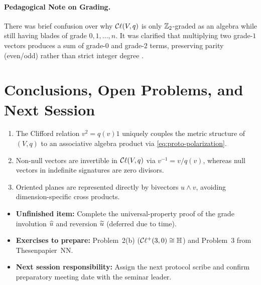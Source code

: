 \documentclass[11pt,a4paper]{article}
\begin{document}
\paragraph{Pedagogical Note on Grading.}
There was brief confusion over why $\mathcal{C}\ell(V, q)$ is only $\mathbb{Z}_2$-graded as an
algebra while still having blades of grade $0, 1, \dots, n$. It was clarified
that multiplying two grade-$1$ vectors produces a sum of grade-$0$ and
grade-$2$ terms, preserving parity (even/odd) rather than strict integer
degree \cite[Sect.~2.2]{vazIntroductionCliffordAlgebras2016}.

\section{Conclusions, Open Problems, and Next Session}
\label{sec:conclusions}

\begin{takeaways}
  \begin{enumerate}
    \item The Clifford relation $v^2 = q(v) 1$ uniquely couples the metric
      structure of $(V, q)$ to an associative algebra product via
      \cref{eq:proto-polarization}.
    \item Non-null vectors are invertible in $\mathcal{C}\ell(V, q)$ via $v^{-1} = v/q(v)$,
      whereas null vectors in indefinite signatures are zero divisors.
    \item Oriented planes are represented directly by bivectors $u \wedge v$,
      avoiding dimension-specific cross products.
  \end{enumerate}
\end{takeaways}

\begin{nextsession}
  \begin{itemize}
    \item \textbf{Unfinished item:} Complete the universal-property proof of
      the grade involution $\widehat{u}$ and reversion $\widetilde{u}$ (deferred due to
      time).
    \item \textbf{Exercises to prepare:} Problem~2(b) ($\mathcal{C}\ell^+(3,0) \cong
      \mathbb{H}$) and Problem~3 from Thesenpapier~NN.
    \item \textbf{Next session responsibility:} Assign the next protocol scribe
      and confirm preparatory meeting date with the seminar leader.
  \end{itemize}
\end{nextsession}

\printbibliography[title={References Cited in Discussion}]
\end{document}
